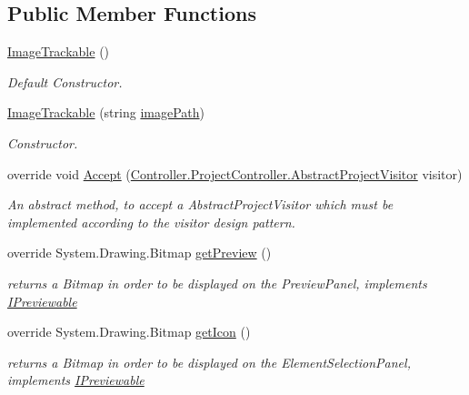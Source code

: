 \subsection*{Public Member Functions}
\begin{DoxyCompactItemize}
\item 
\hyperlink{class_a_rdev_kit_1_1_model_1_1_project_1_1_image_trackable_a2a0ee33f17a65ba9107fb30871c0e36d}{Image\-Trackable} ()
\begin{DoxyCompactList}\small\item\em Default Constructor. \end{DoxyCompactList}\item 
\hyperlink{class_a_rdev_kit_1_1_model_1_1_project_1_1_image_trackable_ab325e30ad03ff3ac68ce3f71592e42d5}{Image\-Trackable} (string \hyperlink{class_a_rdev_kit_1_1_model_1_1_project_1_1_image_trackable_a1da6761ca1dd74ff7981d0b19774de99}{image\-Path})
\begin{DoxyCompactList}\small\item\em Constructor. \end{DoxyCompactList}\item 
override void \hyperlink{class_a_rdev_kit_1_1_model_1_1_project_1_1_image_trackable_af225ee2673ffa037cd88a00feb77e890}{Accept} (\hyperlink{class_a_rdev_kit_1_1_controller_1_1_project_controller_1_1_abstract_project_visitor}{Controller.\-Project\-Controller.\-Abstract\-Project\-Visitor} visitor)
\begin{DoxyCompactList}\small\item\em An abstract method, to accept a Abstract\-Project\-Visitor which must be implemented according to the visitor design pattern. \end{DoxyCompactList}\item 
override System.\-Drawing.\-Bitmap \hyperlink{class_a_rdev_kit_1_1_model_1_1_project_1_1_image_trackable_a96e42ce5c75d50a49b617d8eb8f87b99}{get\-Preview} ()
\begin{DoxyCompactList}\small\item\em returns a Bitmap in order to be displayed on the Preview\-Panel, implements \hyperlink{interface_a_rdev_kit_1_1_model_1_1_project_1_1_i_previewable}{I\-Previewable} \end{DoxyCompactList}\item 
override System.\-Drawing.\-Bitmap \hyperlink{class_a_rdev_kit_1_1_model_1_1_project_1_1_image_trackable_af11655160fd026f62dca5948cdf630cd}{get\-Icon} ()
\begin{DoxyCompactList}\small\item\em returns a Bitmap in order to be displayed on the Element\-Selection\-Panel, implements \hyperlink{interface_a_rdev_kit_1_1_model_1_1_project_1_1_i_previewable}{I\-Previewable} \end{DoxyCompactList}\item 

\end{DoxyCompactItemize}
